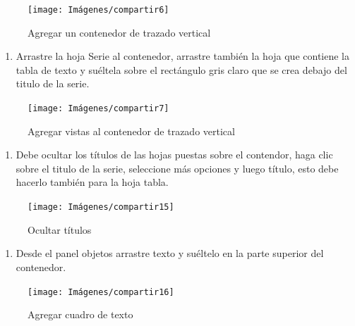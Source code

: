 \documentclass[
]{book}
\providecommand{\tightlist}{%
  \setlength{\itemsep}{0pt}\setlength{\parskip}{0pt}}
\begin{document}
\begin{figure}

{\centering \texttt{[image: Imágenes/compartir6]} 

}

\caption{Agregar un contenedor de trazado vertical}\label{fig:paso8tablero-fig}
\end{figure}

\begin{enumerate}
\def\labelenumi{\arabic{enumi}.}
\setcounter{enumi}{8}
\tightlist
\item
  Arrastre la hoja Serie al contenedor, arrastre también la hoja que contiene la tabla de texto y suéltela sobre el rectángulo gris claro que se crea debajo del titulo de la serie.
\end{enumerate}

\begin{figure}

{\centering \texttt{[image: Imágenes/compartir7]} 

}

\caption{Agregar vistas al contenedor de trazado vertical}\label{fig:paso9tablero-fig}
\end{figure}

\begin{enumerate}
\def\labelenumi{\arabic{enumi}.}
\setcounter{enumi}{9}
\tightlist
\item
  Debe ocultar los títulos de las hojas puestas sobre el contendor, haga clic sobre el titulo de la serie, seleccione más opciones y luego título, esto debe hacerlo también para la hoja tabla.
\end{enumerate}

\begin{figure}

{\centering \texttt{[image: Imágenes/compartir15]} 

}

\caption{Ocultar títulos}\label{fig:paso10tablero-fig}
\end{figure}

\begin{enumerate}
\def\labelenumi{\arabic{enumi}.}
\setcounter{enumi}{10}
\tightlist
\item
  Desde el panel objetos arrastre texto y suéltelo en la parte superior del contenedor.
\end{enumerate}

\begin{figure}

{\centering \texttt{[image: Imágenes/compartir16]} 

}

\caption{Agregar cuadro de texto}\label{fig:paso11tablero-fig}
\end{figure}
\end{document}
